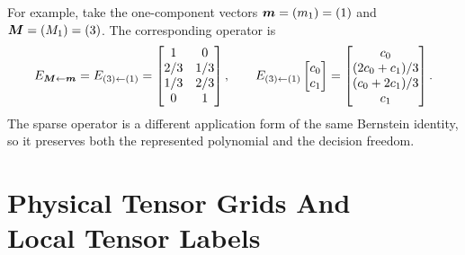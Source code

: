 For example, take the one-component vectors $\boldsymbol{m}=(m_1)=(1)$ and $\boldsymbol{M}=(M_1)=(3)$. The corresponding operator is
\begin{gather*}
E_{\boldsymbol{M}\leftarrow\boldsymbol{m}}=E_{(3)\leftarrow(1)}=
\begin{bmatrix}
1&0\\
2/3&1/3\\
1/3&2/3\\
0&1
\end{bmatrix},
\qquad
E_{(3)\leftarrow(1)}
\begin{bmatrix}c_0\\c_1\end{bmatrix}
=
\begin{bmatrix}c_0\\ (2c_0+c_1)/3\\ (c_0+2c_1)/3\\ c_1\end{bmatrix}.
\end{gather*}
The sparse operator is a different application form of the same Bernstein identity, so it preserves both the represented polynomial and the decision freedom.

\section[Physical Tensor Grids And Local Tensor Labels]{%
  \texorpdfstring{Physical Tensor Grids And\\Local Tensor Labels}%
  {Physical Tensor Grids And Local Tensor Labels}}
\label{sec:bernstein-tensor-grids}

